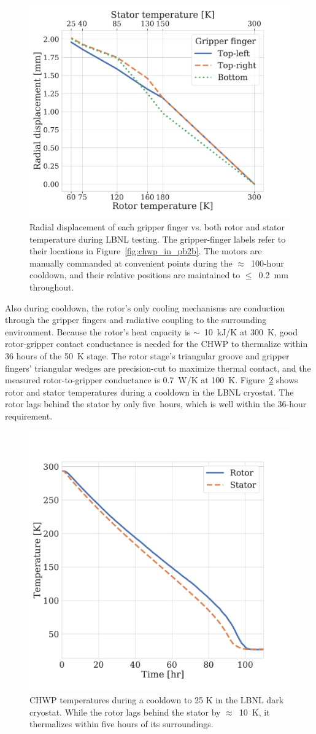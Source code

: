 \begin{figure}[!t]
    \centering
    \includegraphics[width=0.6\linewidth, trim=0.5cm 0.9cm 2.8cm 0.7cm, clip]{CHWPEvaluation/Figures/gripper_cooldown.pdf}
    \caption{Radial displacement of each gripper finger vs. both rotor and stator temperature during LBNL testing. The gripper-finger labels refer to their locations in Figure~\ref{fig:chwp_in_pb2b}. The motors are manually commanded at convenient points during the $\approx$~100-hour cooldown, and their relative positions are maintained to $\leq$~0.2~mm throughout.}
    \label{fig:gripper_cooldown}
\end{figure}

Also during cooldown, the rotor's only cooling mechanisms are conduction through the gripper fingers and radiative coupling to the surrounding environment. Because the rotor's heat capacity is $\sim$~10~kJ/K at 300~K, good rotor-gripper contact conductance is needed for the CHWP to thermalize within 36 hours of the 50~K stage. The rotor stage's triangular groove and gripper fingers' triangular wedges are precision-cut to maximize thermal contact, and the measured rotor-to-gripper conductance is 0.7~W/K at 100~K. Figure~\ref{fig:rotor_cooldown} shows rotor and stator temperatures during a cooldown in the LBNL cryostat. The rotor lags behind the stator by only five~hours, which is well within the 36-hour requirement. 

\begin{figure}[!t]
    \centering
    \includegraphics[width=0.6\linewidth, trim=0.5cm 1cm 2.5cm 2.4cm, clip]{CHWPEvaluation/Figures/chwp_cooldown.pdf}
    \caption{CHWP temperatures during a cooldown to 25 K in the LBNL dark cryostat. While the rotor lags behind the stator by $\approx$~10~K, it thermalizes within five hours of its surroundings.}
    \label{fig:rotor_cooldown}
\end{figure}

